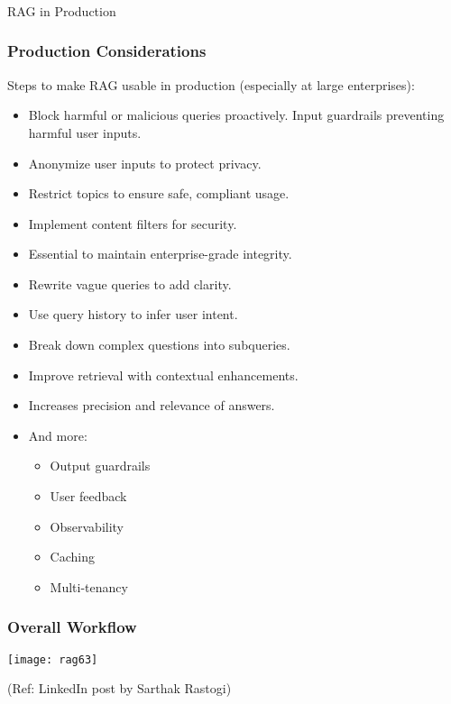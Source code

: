 \begin{frame}[fragile]\frametitle{}
\begin{center}
{\Large RAG in Production}
\end{center}
\end{frame}

\begin{frame}[fragile]\frametitle{Production Considerations}

Steps to make RAG usable in production (especially at large enterprises):

      \begin{itemize}
        \item Block harmful or malicious queries proactively. Input guardrails preventing harmful user inputs.
        \item Anonymize user inputs to protect privacy.
        \item Restrict topics to ensure safe, compliant usage.
        \item Implement content filters for security.
        \item Essential to maintain enterprise-grade integrity.
        \item Rewrite vague queries to add clarity.
        \item Use query history to infer user intent.
        \item Break down complex questions into subqueries.
        \item Improve retrieval with contextual enhancements.
        \item Increases precision and relevance of answers.	
		\item And more:
		  \begin{itemize}
			\item Output guardrails
			\item User feedback
			\item Observability
			\item Caching
			\item Multi-tenancy
		\end{itemize}
      \end{itemize}

\end{frame}

\begin{frame}[fragile]\frametitle{Overall Workflow}

        \begin{center}
        \texttt{[image: rag63]}
		
		{\tiny (Ref: LinkedIn post by Sarthak Rastogi)}
        \end{center}	

\end{frame}


